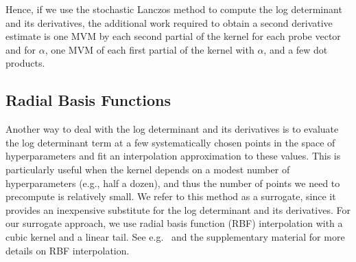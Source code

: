 Hence, if we use the stochastic Lanczos method to compute the log determinant
and its derivatives, the additional work required to obtain a second derivative
estimate is one MVM by each second partial of the kernel for each probe vector
and for $\alpha$, one MVM of each first partial of the kernel with $\alpha$, and
a few dot products.

\subsection{Radial Basis Functions}\label{sgpsec:rbf}
Another way to deal with the log determinant and its derivatives is to evaluate
the log determinant term at a few systematically chosen points in the space of
hyperparameters and fit an interpolation approximation to these values.  This
is particularly useful when the kernel depends on a modest number of
hyperparameters (e.g., half a dozen), and thus the number of points we need to
precompute is relatively small. We refer to this method as a surrogate, since it
provides an inexpensive substitute for the log determinant and its derivatives.
For our surrogate approach, we use radial basis function (RBF) interpolation
with a cubic kernel and a linear tail. See e.g.~\cite{buhmann2000radial,
fasshauer2007meshfree,schaback2006kernel,wendland2004scattered} and the
supplementary material for more details on RBF interpolation.